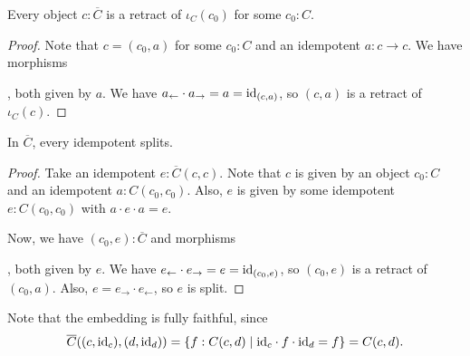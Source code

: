 \begin{lemma}\label{lem:karoubi-is-retract}
  Every object $ c: \overline C $ is a retract of $ \iota_C(c_0) $ for some $ c_0: C $.
\end{lemma}
\begin{proof}
  Note that $ c = (c_0, a) $ for some $ c_0: C $ and an idempotent $ a: c \to c $. We have morphisms
  , both given by $ a $. We have $ a_\leftarrow \cdot a_\rightarrow = a = \text{id}_{(c, a)} $, so $ (c, a) $ is a retract of $ \iota_C(c) $.
\end{proof}

\begin{lemma}
  In $ \overline C $, every idempotent splits.
\end{lemma}
\begin{proof}
  Take an idempotent $ e: \overline C(c, c) $. Note that $ c $ is given by an object $ c_0: C $ and an idempotent $ a: C(c_0, c_0) $. Also, $ e $ is given by some idempotent $ e: C(c_0, c_0) $ with $ a \cdot e \cdot a = e $.

  Now, we have $ (c_0, e): \overline C $ and morphisms
  , both given by $ e $. We have $ e_\leftarrow \cdot e_\rightarrow = e = \text{id}_{(c_0, e)} $, so $ (c_0, e) $ is a retract of $ (c_0, a) $. Also, $ e = e_\rightarrow \cdot e_\leftarrow $, so $ e $ is split.
\end{proof}

\begin{remark}
  Note that the embedding is fully faithful, since
  \[ \overline C((c, \text{id}_{c}), (d, \text{id}_{d})) = \{ f: C(c, d) \mid \text{id}_{c} \cdot f \cdot \text{id}_{d} = f \} = C(c, d). \]
\end{remark}

